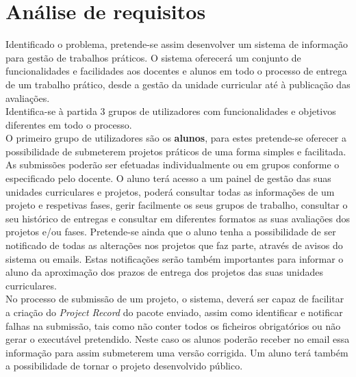 \section{Análise de requisitos}

Identificado o problema, pretende-se assim desenvolver um sistema de informação para gestão de trabalhos práticos. O sistema oferecerá um conjunto de funcionalidades e facilidades aos docentes e alunos em todo o processo de entrega de um trabalho prático, desde a gestão da unidade curricular até à publicação das avaliações.\\

Identifica-se à partida 3 grupos de utilizadores com funcionalidades e objetivos diferentes em todo o processo.\\

O primeiro grupo de utilizadores são os \textbf{alunos}, para estes pretende-se oferecer a possibilidade de submeterem projetos práticos de uma forma simples e facilitada. As submissões poderão ser efetuadas individualmente ou em grupos conforme o especificado pelo docente. O aluno terá acesso a um painel de gestão das suas unidades curriculares e projetos, poderá consultar todas as informações de um projeto e respetivas fases, gerir facilmente os seus grupos de trabalho, consultar o seu histórico de entregas e consultar em diferentes formatos as suas avaliações dos projetos e/ou fases. Pretende-se ainda que o aluno tenha a possibilidade de ser notificado de todas as alterações nos projetos que faz parte, através de avisos do sistema ou emails. Estas notificações serão também importantes para informar o aluno da aproximação dos prazos de entrega dos projetos das suas unidades curriculares.\\
No processo de submissão de um projeto, o sistema, deverá ser capaz de facilitar a criação do \textit{Project Record} do pacote enviado, assim como identificar e notificar falhas na submissão, tais como não conter todos os ficheiros obrigatórios ou não gerar o executável pretendido. Neste caso os alunos poderão receber no email essa informação para assim submeterem uma versão corrigida.
Um aluno terá também a possibilidade de tornar o projeto desenvolvido público.\\

